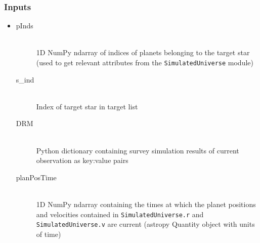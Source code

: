 \documentclass[cleanfoot]{asme2ej}
\begin{document}
\subsubsection*{Inputs}
\begin{itemize}
    \item 
    \begin{description}
        \item[pInds] \hfill \\
        1D NumPy ndarray of indices of planets belonging to the target star (used to get relevant attributes from the \verb+SimulatedUniverse+ module)
        \item[s\_ind] \hfill \\
        Index of target star in target list
        \item[DRM] \hfill \\
        Python dictionary containing survey simulation results of current observation as key:value pairs
        \item[planPosTime] \hfill \\
        1D NumPy ndarray containing the times at which the planet positions and velocities contained in \verb+SimulatedUniverse.r+ and \verb+SimulatedUniverse.v+ are current (astropy Quantity object with units of time)
    \end{description}
\end{itemize}
\end{document}
